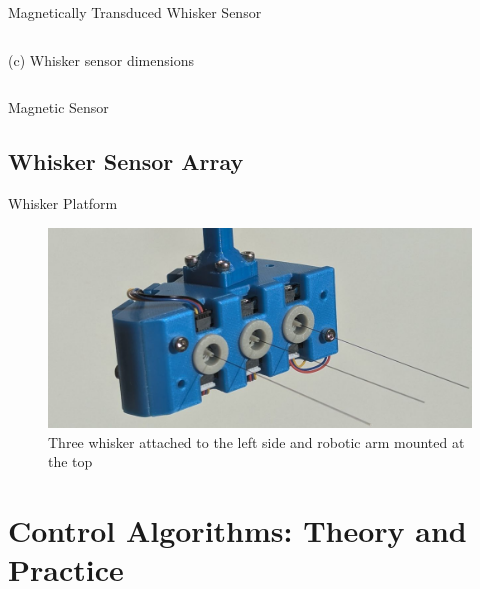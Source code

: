 \documentclass[AIRbeamer
,optEnglish
,optBiber
,optBibstyleAlphabetic
,optBeamerClassicFormat%
]{AIRlatex}
\begin{document}
\begin{frame}[c]{Magnetically Transduced Whisker Sensor}
\begin{columns}[c,onlytextwidth]
            (c) Whisker sensor dimensions
        \end{columns}
    \end{frame}


    \begin{frame}{Magnetic Sensor}
    \end{frame}

    \subsection{Whisker Sensor Array}

    \begin{frame}{Whisker Platform}
        \begin{figure}[ht]
            \centering
            \includegraphics[width=0.8\textheight]{figures/platform}
            \caption{Three whisker attached to the left side and robotic arm mounted at the top}
        \end{figure}
    \end{frame}


    \section{Control Algorithms: Theory and Practice}
\end{document}
